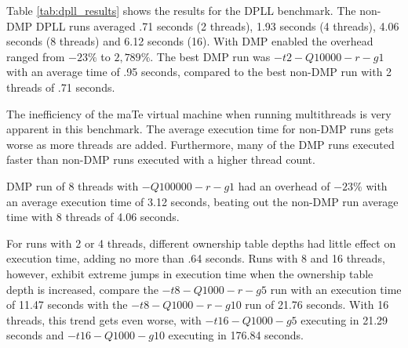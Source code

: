 Table \ref{tab:dpll_results} shows the results for the DPLL benchmark.
The non-DMP DPLL runs averaged .71 seconds (2 threads), 1.93 seconds
(4 threads), 4.06 seconds (8 threads) and 6.12 seconds (16).  With DMP
enabled the overhead ranged from $-23\%$ to $2,789\%$.  The best DMP
run was $-t2 -Q10000 -r -g1$ with an average time of .95 seconds,
compared to the best non-DMP run with 2 threads of .71 seconds.

The inefficiency of the maTe virtual machine when running multithreads
is very apparent in this benchmark.  The average execution time for
non-DMP runs gets worse as more threads are added.  Furthermore, many
of the DMP runs executed faster than non-DMP runs executed with a
higher thread count.

DMP run of 8 threads with $-Q100000 -r -g1$ had an overhead of $-23\%$
with an average execution time of 3.12 seconds, beating out the
non-DMP run average time with 8 threads of 4.06 seconds.


For runs with 2 or 4 threads, different ownership table depths had
little effect on execution time, adding no more than .64 seconds.
Runs with 8 and 16 threads, however, exhibit extreme jumps in
execution time when the ownership table depth is increased, compare
the $-t8 -Q1000 -r -g5$ run with an execution time of 11.47 seconds
with the $-t8 -Q1000 -r -g10$ run of 21.76 seconds.  With 16 threads,
this trend gets even worse, with $-t16 -Q1000 -g5$ executing in 21.29
seconds and $-t16 -Q1000 -g10$ executing in 176.84 seconds.



